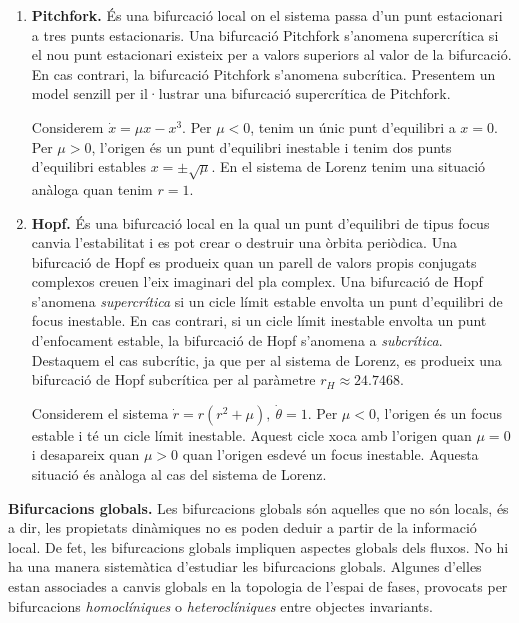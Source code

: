 \documentclass[11pt,a4paper,openright,oneside]{article}
\numberwithin{equation}{section}
\theoremstyle{definition}
\begin{document}
\begin{enumerate}
    \item \textbf{Pitchfork.} És una bifurcació local on el sistema passa d'un punt estacionari a tres punts estacionaris. Una bifurcació Pitchfork s'anomena supercrítica si el nou punt estacionari existeix per a valors superiors al valor de la bifurcació. En cas contrari, la bifurcació Pitchfork s'anomena subcrítica. Presentem un model senzill per il·lustrar una bifurcació supercrítica de Pitchfork. 
    
    Considerem $\dot{x}=\mu x-x^{3}$. Per $\mu<0$, tenim un únic punt d'equilibri a $x=0$. Per $\mu>0$, l'origen és un punt d'equilibri inestable i tenim dos punts d'equilibri estables $x=\pm \sqrt{\mu}$. En el sistema de Lorenz tenim una situació anàloga quan tenim $r=1$.

    \item \textbf{Hopf.} És una bifurcació local en la qual un punt d'equilibri de tipus focus canvia l'estabilitat i es pot crear o destruir una òrbita periòdica. Una bifurcació de Hopf es produeix quan un parell de valors propis conjugats complexos creuen l'eix imaginari del pla complex. Una bifurcació de Hopf s'anomena \textit{supercrítica} si un cicle límit estable envolta un punt d'equilibri de focus inestable. En cas contrari, si un cicle límit inestable envolta un punt d'enfocament estable, la bifurcació de Hopf s'anomena a \textit{subcrítica}. Destaquem el cas subcrític, ja que per al sistema de Lorenz, es produeix una bifurcació de Hopf subcrítica per al paràmetre $r_H\approx24.7468$. 
    
    Considerem el sistema $\dot{r}=r\left(r^{2}+\mu \right), \ \dot{\theta}=1$. Per $\mu<0$, l'origen és un focus estable i té un cicle límit inestable. Aquest cicle xoca amb l'origen quan $\mu=0$ i desapareix quan $\mu>0$ quan l'origen esdevé un focus inestable. Aquesta situació és anàloga al cas del sistema de Lorenz.
\end{enumerate}

\textbf{Bifurcacions globals.} Les bifurcacions globals són aquelles que no són locals, és a dir, les propietats dinàmiques no es poden deduir a partir de la informació local. De fet, les bifurcacions globals impliquen aspectes globals dels fluxos. No hi ha una manera sistemàtica d'estudiar les bifurcacions globals. Algunes d'elles estan associades a canvis globals en la topologia de l'espai de fases, provocats per bifurcacions \textit{homoclíniques} o \textit{heteroclíniques} entre objectes invariants. 
\end{document}

